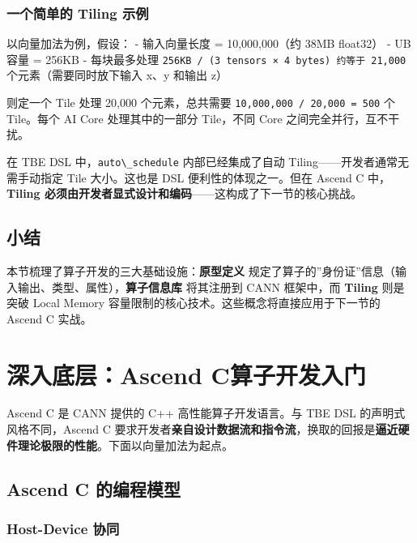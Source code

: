 \subsubsection{一个简单的 Tiling 示例}\label{src-book-chapter7-h40}

以向量加法为例，假设： - 输入向量长度 = 10,000,000（约 38MB float32） -
UB 容量 = 256KB - 每块最多处理
\passthrough{\lstinline!256KB / (3 tensors × 4 bytes) 约等于 21,000!}
个元素（需要同时放下输入 x、y 和输出 z）

则定一个 Tile 处理 20,000 个元素，总共需要
\passthrough{\lstinline!10,000,000 / 20,000 = 500!} 个 Tile。每个 AI
Core 处理其中的一部分 Tile，不同 Core 之间完全并行，互不干扰。

在 TBE DSL 中，\passthrough{\lstinline!auto\_schedule!}
内部已经集成了自动 Tiling------开发者通常无需手动指定 Tile 大小。这也是
DSL 便利性的体现之一。但在 Ascend C 中，\textbf{Tiling
必须由开发者显式设计和编码}------这构成了下一节的核心挑战。

\subsection{小结}\label{src-book-chapter7-h41}

本节梳理了算子开发的三大基础设施：\textbf{原型定义}
规定了算子的''身份证''信息（输入输出、类型、属性），\textbf{算子信息库}
将其注册到 CANN 框架中，而 \textbf{Tiling} 则是突破 Local Memory
容量限制的核心技术。这些概念将直接应用于下一节的 Ascend C 实战。

\section{深入底层：Ascend C算子开发入门}\label{src-book-chapter7-h42}

Ascend C 是 CANN 提供的 C++ 高性能算子开发语言。与 TBE DSL
的声明式风格不同，Ascend C
要求开发者\textbf{亲自设计数据流和指令流}，换取的回报是\textbf{逼近硬件理论极限的性能}。下面以向量加法为起点。

\subsection{Ascend C 的编程模型}\label{src-book-chapter7-h43}

\subsubsection{Host-Device 协同}\label{src-book-chapter7-h44}

